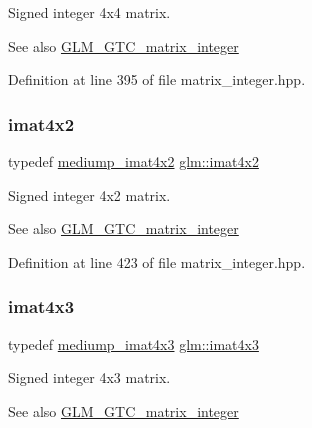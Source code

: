 Signed integer 4x4 matrix. \begin{DoxySeeAlso}{See also}
\hyperlink{group__gtc__matrix__integer}{G\+L\+M\+\_\+\+G\+T\+C\+\_\+matrix\+\_\+integer} 
\end{DoxySeeAlso}


Definition at line 395 of file matrix\+\_\+integer.\+hpp.

\mbox{\label{group__gtc__matrix__integer_ga7e733984837e0e7aa9f4aac18f632f63}} 
\subsubsection{\texorpdfstring{imat4x2}{imat4x2}}
{\footnotesize\ttfamily typedef \hyperlink{group__gtc__matrix__integer_gacdae7d6ae4820756c62c2b5fd5c0370a}{mediump\+\_\+imat4x2} \hyperlink{group__gtc__matrix__integer_ga7e733984837e0e7aa9f4aac18f632f63}{glm\+::imat4x2}}

Signed integer 4x2 matrix. \begin{DoxySeeAlso}{See also}
\hyperlink{group__gtc__matrix__integer}{G\+L\+M\+\_\+\+G\+T\+C\+\_\+matrix\+\_\+integer} 
\end{DoxySeeAlso}


Definition at line 423 of file matrix\+\_\+integer.\+hpp.

\mbox{\label{group__gtc__matrix__integer_gaa4cca8e80c0603239eda452860063844}} 
\subsubsection{\texorpdfstring{imat4x3}{imat4x3}}
{\footnotesize\ttfamily typedef \hyperlink{group__gtc__matrix__integer_ga5032ee978a55aa0db4842d5c3cbeade0}{mediump\+\_\+imat4x3} \hyperlink{group__gtc__matrix__integer_gaa4cca8e80c0603239eda452860063844}{glm\+::imat4x3}}

Signed integer 4x3 matrix. \begin{DoxySeeAlso}{See also}
\hyperlink{group__gtc__matrix__integer}{G\+L\+M\+\_\+\+G\+T\+C\+\_\+matrix\+\_\+integer} 
\end{DoxySeeAlso}


